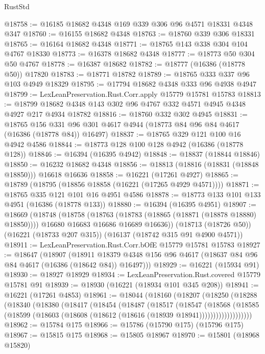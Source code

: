 \begin{lexlean}{RustStd}
\begin{coremodule}
@18758 := @16185 @18682 @4348 @169 @339 @306 @96 @4571 @18331 @4348 @347
@18760 := @16155 @18682 @4348
@18763 := @18760 @339 @306 @18331
@18765 := @16164 @18682 @4348
@18771 := @18765 @143 @338 @304 @104 @4767 @18330
@18773 := @16378 @18682 @4348
@18777 := @18773 @50 @304 @50 @4767
@18778 := @16387 @18682
@18782 := @18777 (@16386 (@18778 @50)) @17820
@18783 := @18771 @18782
@18789 := @18765 @333 @337 @96 @103 @4949 @18329
@18795 := @17794 @18682 @4348 @333 @96 @4938 @4947
@18799 := LexLeanPreservation.Rust.Corr.apply @15779 @15781 @15783
@18813 := @18799 @18682 @4348 @143 @302 @96 @4767 @332 @4571 @4945 @4348 @4927 @217 @4934 @18782
@18816 := @18760 @332 @302 @4945
@18831 := @18765
    @156
    @331
    @96
    @301
    @4617
    @4944
    (@18773 @84 @96 @84 @4617 (@16386 (@18778 @84)) @16497)
@18837 := @18765 @329 @121 @100 @16 @4942 @4586
@18844 := @18773 @128 @100 @128 @4942 (@16386 (@18778 @128))
@18846 := @16394 (@16395 @4942)
@18848 := @18837 (@18844 @18846)
@18850 := @16232 @18682 @4348
@18856 := @18813 (@18816 (@18831 (@18848 @18850))) @16618 @16636
@18858 := @16221 (@17261 @4927)
@18865 := @18789 (@18795 (@18856 @18858 (@16221 (@17265 @4929 @4571))))
@18871 := @18765 @335 @121 @101 @16 @4951 @4586
@18878 := @18773 @133 @101 @133 @4951 (@16386 (@18778 @133))
@18880 := @16394 (@16395 @4951)
@18907 := @18669
    (@18748
      (@18758
        (@18763 (@18783 (@18865 (@18871 (@18878 @18880) @18850))))
        @16680
        @16683
        @16686
        @16689
        @16636))
    (@18713 (@18726 @50))
    (@16221 (@18733 @207 @315))
    (@16137 (@18742 @315 @91 @4900 @4571))
@18911 := LexLeanPreservation.Rust.Corr.bOfE @15779 @15781 @15783
@18927 := @18647
    (@18907
      (@18911 @18379 @4348 @156 @96 @4617 (@18637 @84 @96 @84 @4617 (@16386 (@18642 @84)) @16497)))
@18929 := @16221 (@15934 @91)
@18930 := @18927 @18929
@18934 := LexLeanPreservation.Rust.covered @15779 @15781 @91
@18939 := @18930 (@16221 (@18934 @101 @345 @208))
@18941 := @16221 (@17261 @4853)
@18961 := @18044
    (@18160
      (@18207
        (@18250
          (@18288
            (@18340
              (@18380
                (@18417
                  (@18454
                    (@18487
                      (@18517
                        (@18547
                          (@18568
                            (@18585
                              (@18599
                                (@18603 (@18608 (@18612 (@18616 (@18939 @18941)))))))))))))))))))
@18962 := @15784 @175
@18966 := @15786 (@15790 @175) (@15796 @175)
@18967 := @15815 @175
@18968 := @15805 @18967
@18970 := @15801 (@18968 @15820)

\end{coremodule}
\end{lexlean}

